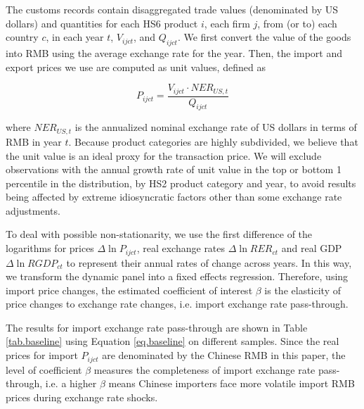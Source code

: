 \documentclass[12pt]{article}
\begin{document}
The customs records contain disaggregated trade values (denominated by US dollars) and quantities for each HS6 product $i$, each firm $j$, from (or to) each country $c$, in each year $t$, $V_{ijct}$, and $Q_{ijct}$. We first convert the value of the goods into RMB using the average exchange rate for the year. Then, the import and export prices we use are computed as unit values, defined as 

$$
P_{ijct}=\frac{V_{ijct}\cdot NER_{US,t}}{Q_{ijct}}
$$

where $NER_{US,t}$ is the annualized nominal exchange rate of US dollars in terms of RMB in year $t$. Because product categories are highly subdivided, we believe that the unit value is an ideal proxy for the transaction price. We will exclude observations with the annual growth rate of unit value in the top or bottom 1 percentile in the distribution, by HS2 product category and year, to avoid results being affected by extreme idiosyncratic factors other than some exchange rate adjustments.

To deal with possible non-stationarity, we use the first difference of the logarithms for prices $\Delta \ln P_{i j c t}$, real exchange rates $\Delta \ln R E R_{c t}$ and real GDP $\Delta \ln R G D P_{c t}$ to represent their annual rates of change across years. In this way, we transform the dynamic panel into a fixed effects regression. Therefore, using import price changes, the estimated coefficient of interest $\beta$ is the elasticity of price changes to exchange rate changes, i.e. import exchange rate pass-through.

The results for import exchange rate pass-through are shown in Table \ref{tab.baseline} using Equation \ref{eq.baseline} on different samples. Since the real prices for import $P_{i j c t}$ are denominated by the Chinese RMB in this paper, the level of coefficient $\beta$ measures the completeness of import exchange rate pass-through, i.e. a higher $\beta$ means Chinese importers face more volatile import RMB prices during exchange rate shocks. 
\end{document}
